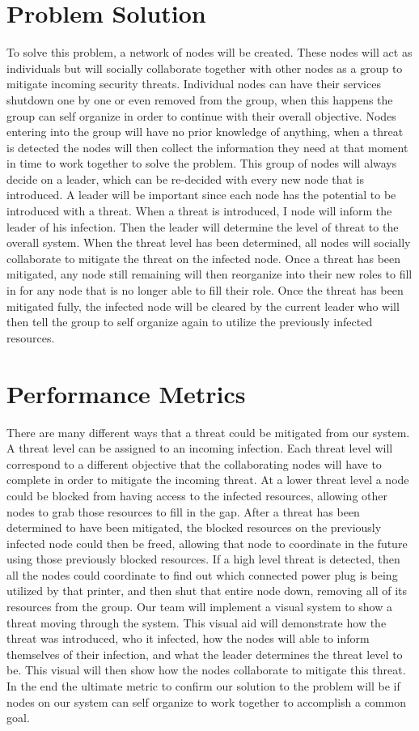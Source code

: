 \documentclass[draftclsnofoot, onecolumn, 10pt]{IEEEtran}
\begin{document}
\section*{Problem Solution}
To solve this problem, a network of nodes will be created. These nodes will act as individuals but will socially collaborate together with other nodes as a group to mitigate incoming security threats. Individual nodes can have their services shutdown one by one or even removed from the group, when this happens the group can self organize in order to continue with their overall objective. Nodes entering into the group will have no prior knowledge of anything, when a threat is detected the nodes will then collect the information they need at that moment in time to work together to solve the problem. This group of nodes will always decide on a leader, which can be re-decided with every new node that is introduced. A leader will be important since each node has the potential to be introduced with a threat. When a threat is introduced, I node will inform the leader of his infection. Then the leader will determine the level of threat to the overall system. When the threat level has been determined, all nodes will socially collaborate to mitigate the threat on the infected node. Once a threat has been mitigated, any node still remaining will then reorganize into their new roles to fill in for any node that is no longer able to fill their role. Once the threat has been mitigated fully, the infected node will be cleared by the current leader who will then tell the group to self organize again to utilize the previously infected resources. 



\section*{Performance Metrics}
There are many different ways that a threat could be mitigated from our system. A threat level can be assigned to an incoming infection. Each threat level will correspond to a different objective that the collaborating nodes will have to complete in order to mitigate the incoming threat. At a lower threat level a node could be blocked from having access to the infected resources, allowing other nodes to grab those resources to fill in the gap. After a threat has been determined to have been mitigated, the blocked resources on the previously infected node could then be freed, allowing that node to coordinate in the future using those previously blocked resources. If a high level threat is detected, then all the nodes could coordinate to find out which connected power plug is being utilized by that printer, and then shut that entire node down, removing all of its resources from the group. Our team will implement a visual system to show a threat moving through the system. This visual aid will demonstrate how the threat was introduced, who it infected, how the nodes will able to inform themselves of their infection, and what the leader determines the threat level to be. This visual will then show how the nodes collaborate to mitigate this threat. In the end the ultimate metric to confirm our solution to the problem will be if nodes on our system can self organize to work together to accomplish a common goal. 
\end{document}
